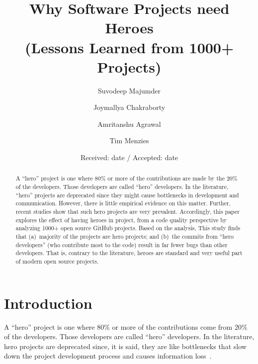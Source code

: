 \documentclass[smallextended]{svjour3}
\begin{document}
\title{Why Software Projects need Heroes\\(Lessons Learned from 1000+ Projects)}


\author{Suvodeep Majumder \and Joymallya Chakraborty \and Amritanshu Agrawal \and Tim Menzies}


\date{Received: date / Accepted: date}
\maketitle

\begin{abstract}
  A ``hero'' project is one where  80\% or more of the contributions are made by the 20\% of the developers. Those developers are called ``hero'' developers. In the literature, ``hero''  projects are  deprecated since they might   cause bottlenecks 
in development and communication. However, there is little empirical evidence on this matter.
Further, recent studies show that such hero projects are very prevalent.
Accordingly, 
this paper explores the effect of having heroes in project, from a code quality perspective by analyzing  1000+ open source GitHub projects. Based on the analysis,
This study finds that   (a)~majority of the projects are hero projects;  and (b)~the
commits from ``hero developers'' (who
contribute most to the code) result in far fewer bugs than other developers.  That is,
contrary
to the literature, 
heroes are standard and very useful  part of modern open source projects.
\end{abstract}


\section{Introduction}
\label{sec:intro}
A ``hero'' project is one where  80\% or more of the contributions come from 20\% of  the developers. Those developers are called ``hero'' developers. 
In the literature, hero projects are deprecated  since, it is said,
they are like bottlenecks that slow down the  project development process and causes information loss~\cite{bier2011online,boehm2006view,hislop2002integrating,morcovcomplex,wood2005multiview,fitzgerald2003making}. 
\end{document}
